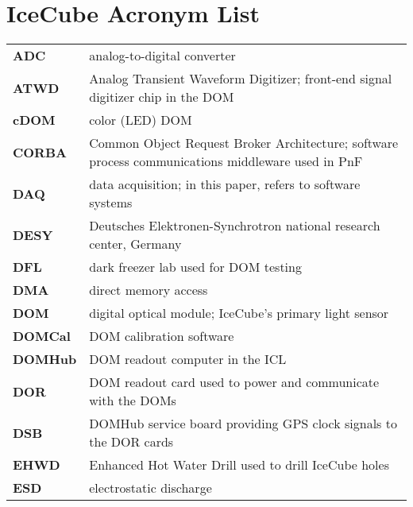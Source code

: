 

\section*{IceCube Acronym List}

\begin{longtable}{p{} p{}}

  \textbf{ADC} & analog-to-digital converter \\

  \textbf{ATWD} & Analog Transient Waveform Digitizer; front-end signal
  digitizer chip in the DOM \\

  \textbf{cDOM} & color (LED) DOM \\

  \textbf{CORBA} & Common Object Request Broker Architecture; software
  process communications middleware used in PnF \\
  
  \textbf{DAQ} & data acquisition; in this paper, refers to software
  systems \\

  \textbf{DESY} & Deutsches Elektronen-Synchrotron national research
  center, Germany \\
  
  \textbf{DFL} & dark freezer lab used for DOM testing \\

  \textbf{DMA} & direct memory access \\
  
  \textbf{DOM} & digital optical module; IceCube's primary light sensor \\

  \textbf{DOMCal} & DOM calibration software \\

  \textbf{DOMHub} & DOM readout computer in the ICL \\
  
  \textbf{DOR} & DOM readout card used to power and communicate with
  the DOMs \\

  \textbf{DSB} & DOMHub service board providing GPS clock signals to
  the DOR cards \\
  
  \textbf{EHWD} & Enhanced Hot Water Drill used to drill IceCube holes \\
  
  \textbf{ESD} & electrostatic discharge \\
  

\end{longtable}

